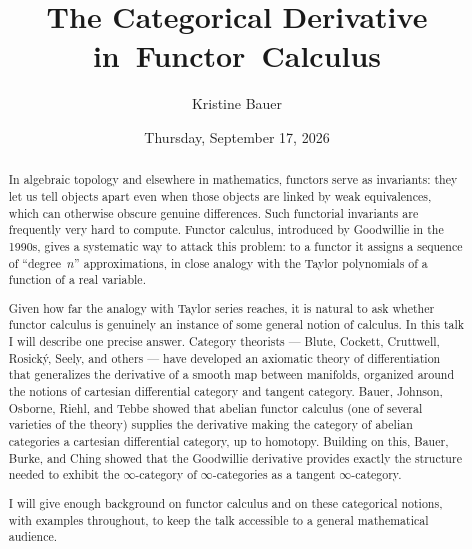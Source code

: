 \documentclass{UAmathtalk}
\author{Kristine Bauer}
\title{The Categorical Derivative in~Functor~Calculus}
\date{Thursday, September 17, 2026}
\begin{document}
\maketitle

\begin{abstract}
In algebraic topology and elsewhere in mathematics, functors serve as invariants: they let us tell objects apart even when those objects are linked by weak equivalences, which can otherwise obscure genuine differences. Such functorial invariants are frequently very hard to compute. Functor calculus, introduced by Goodwillie in the 1990s, gives a systematic way to attack this problem: to a functor it assigns a sequence of ``degree~$n$'' approximations, in close analogy with the Taylor polynomials of a function of a real variable. 

Given how far the analogy with Taylor series reaches, it is natural to ask whether functor calculus is genuinely an instance of some general notion of calculus. In this talk I will describe one precise answer. Category theorists --- Blute, Cockett, Cruttwell, Rosický, Seely, and others --- have developed an axiomatic theory of differentiation that generalizes the derivative of a smooth map between manifolds, organized around the notions of cartesian differential category and tangent category. Bauer, Johnson, Osborne, Riehl, and Tebbe showed that abelian functor calculus (one of several varieties of the theory) supplies the derivative making the category of abelian categories a cartesian differential category, up to homotopy. Building on this, Bauer, Burke, and Ching showed that the Goodwillie derivative provides exactly the structure needed to exhibit the $\infty$-category of $\infty$-categories as a tangent $\infty$-category.

I will give enough background on functor calculus and on these categorical notions, with examples throughout, to keep the talk accessible to a general mathematical audience.
\end{abstract}
\end{document}
